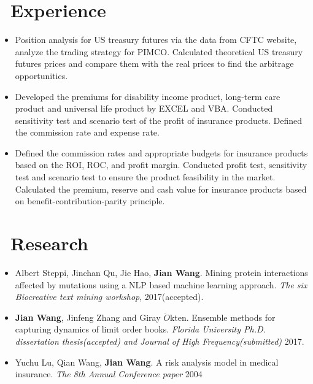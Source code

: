 \documentclass{resume}
\begin{document}
\section{\faGears\ Experience}
\large {}
\begin{itemize}\large
	\item Position analysis for US treasury futures via the data from CFTC website,  analyze the trading strategy for PIMCO. Calculated theoretical US treasury futures prices and compare them with the real prices to find the arbitrage opportunities.
\end{itemize}
\large {}
\begin{itemize}\large
  \item Developed the premiums for disability income product,  long-term care product and universal life product by EXCEL and VBA. Conducted sensitivity test and scenario test of the profit of insurance products. Defined the commission rate and expense rate. 
  
  
\end{itemize}

\large {}
\begin{itemize}\large
  \item Defined the commission rates and appropriate budgets for insurance products based on the ROI,  ROC, and profit margin. Conducted profit test,  sensitivity test and scenario test to ensure the product feasibility in the market. Calculated the premium,  reserve and cash value for insurance products based on benefit-contribution-parity principle.
\end{itemize}
\section{\faBook\ Research}

\begin{itemize}[parsep=0.5ex]\large
  \item Albert Steppi, Jinchan Qu, Jie Hao, \textbf{Jian Wang}. Mining protein interactions affected by mutations using a NLP based machine learning approach. \textit{The six Biocreative text mining workshop}, 2017(accepted).
  \item \textbf{Jian Wang}, Jinfeng Zhang and Giray $\ddot{O}$kten. Ensemble methods for capturing dynamics of limit order books. \textit{Florida University Ph.D. dissertation thesis(accepted) and Journal of High Frequency(submitted)} 2017.
  \item Yuchu Lu, Qian Wang, \textbf{Jian Wang}. A risk analysis model in medical insurance. \textit{The 8th Annual Conference paper} 2004 
  
\end{itemize}
    
\end{document}
